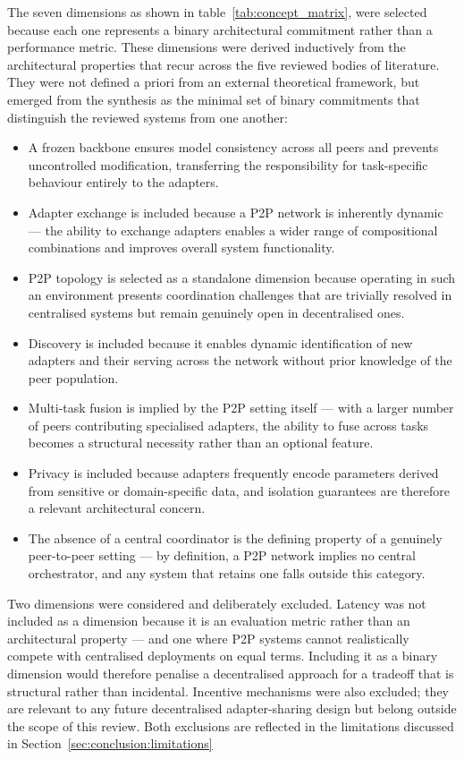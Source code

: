 The seven dimensions as shown in table~\ref{tab:concept_matrix}, were selected because each one represents a binary architectural commitment rather than a performance metric. These dimensions were derived inductively from the architectural properties that recur across the five reviewed bodies of literature. They were not defined a priori from an external theoretical framework, but emerged from the synthesis as the minimal set of binary commitments that distinguish the reviewed systems from one another:
\begin{itemize}
    \item A frozen backbone ensures model consistency across all peers and prevents uncontrolled modification, transferring the responsibility for task-specific behaviour entirely to the adapters. 
    \item Adapter exchange is included because a P2P network is inherently dynamic — the ability to exchange adapters enables a wider range of compositional combinations and improves overall system functionality. 
    \item P2P topology is selected as a standalone dimension because operating in such an environment presents coordination challenges that are trivially resolved in centralised systems but remain genuinely open in decentralised ones.
    \item  Discovery is included because it enables dynamic identification of new adapters and their serving across the network without prior knowledge of the peer population. 
    \item Multi-task fusion is implied by the P2P setting itself — with a larger number of peers contributing specialised adapters, the ability to fuse across tasks becomes a structural necessity rather than an optional feature. 
    \item Privacy is included because adapters frequently encode parameters derived from sensitive or domain-specific data, and isolation guarantees are therefore a relevant architectural concern. 
    \item The absence of a central coordinator is the defining property of a genuinely peer-to-peer setting --- by definition, a P2P network implies no central orchestrator, and any system that retains one falls outside this category.
\end{itemize}

Two dimensions were considered and deliberately excluded. Latency was not included as a dimension because it is an evaluation metric rather than an architectural property — and one where P2P systems cannot realistically compete with centralised deployments on equal terms. Including it as a binary dimension would therefore penalise a decentralised approach for a tradeoff that is structural rather than incidental. Incentive mechanisms were also excluded; they are relevant to any future decentralised adapter-sharing design but belong outside the scope of this review. Both exclusions are reflected in the limitations discussed in Section~\ref{sec:conclusion:limitations}

